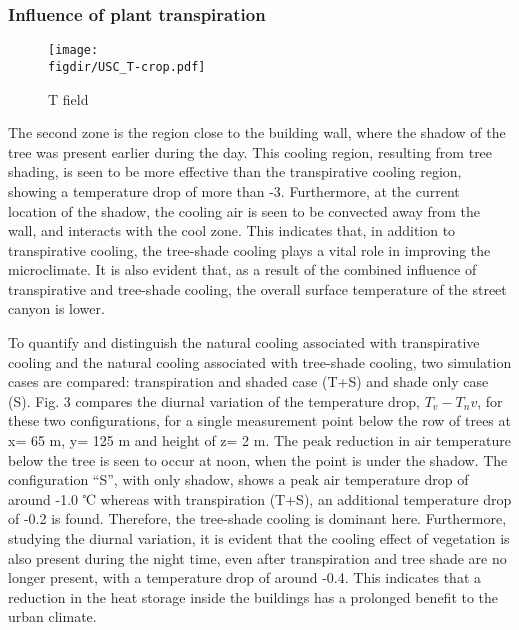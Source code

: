 
\subsubsection*{Influence of plant transpiration}

\begin{sidewaysfigure}[p]
	\centering
	\texttt{[image: \\figdir/USC\_T-crop.pdf]}
	\caption{T field}
	\label{fig:USC_T}
\end{sidewaysfigure}



The second zone is the region close to the building wall, where the shadow of the tree was present earlier during the day. This cooling region, resulting from tree shading, is seen to be more effective than the transpirative cooling region, showing a temperature drop of more than -3. Furthermore, at the current location of the shadow, the cooling air is seen to be convected away from the wall, and interacts with the cool zone. This indicates that, in addition to transpirative cooling, the tree-shade cooling plays a vital role in improving the microclimate. It is also evident that, as a result of the combined influence of transpirative and tree-shade cooling, the overall surface temperature of the street canyon is lower.

To quantify and distinguish the natural cooling associated with transpirative cooling and the natural cooling associated with tree-shade cooling, two simulation cases are compared: transpiration and shaded case (T+S) and shade only case (S). Fig. 3 compares the diurnal variation of the temperature drop, $T_v-T_nv$, for these two configurations, for a single measurement point below the row of trees at x= 65 m, y= 125 m and height of z= 2 m. The peak reduction in air temperature below the tree is seen to occur at noon, when the point is under the shadow. The configuration “S”, with only shadow, shows a peak air temperature drop of around -1.0 ℃ whereas with transpiration (T+S), an additional temperature drop of -0.2 is found. Therefore, the tree-shade cooling is dominant here. Furthermore, studying the diurnal variation, it is evident that the cooling effect of vegetation is also present during the night time, even after transpiration and tree shade are no longer present, with a temperature drop of around -0.4. This indicates that a reduction in the heat storage inside the buildings has a prolonged benefit to the urban climate.


